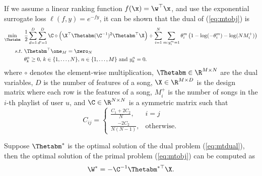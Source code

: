 If we assume a linear ranking function $f(\x) = \w^\top \x$, 
and use the exponential surrogate loss $\ell(f, y) = e^{-fy}$,
it can be shown that the dual of (\ref{eq:mtobj}) is
\begin{equation}
\label{eq:mtdual}
\begin{aligned}
\min_{\Thetabm} \ \ & \frac{1}{2} \sum_{d=1}^{D} \sum_{d'=1}^{D} \C \circ \left( \X^\top \Thetabm (\C^{-1})^2 \Thetabm^\top \X \right) 
    + \sum_{i = 1}^{N} \sum_{m: y_i^m = 1} \theta_i^m \left( 1 - \log(-\theta_i^m) - \log(N M_i^+) \right) \\
s.t. \ & \Thetabm^\top \one_M = \zero_{N} \\
       & \theta_k^n \ge 0, \, k \in \{1,\dots,N\}, \, n \in \{1,\dots,M\} \ \mathrm{and} \ y_k^n = 0.
\end{aligned}
\end{equation}
where $\circ$ denotes the element-wise multiplication,
$\Thetabm \in \R^{M \times N}$ are the dual variables, $D$ is the number of features of a song, 
$\X \in \R^{M \times D}$ is the design matrix where each row is the features of a song,
$M_i^+$ is the number of songs in the $i$-th playlist of user $u$,
and $\C \in \R^{N \times N}$ is a symmetric matrix such that
\begin{equation*}
C_{ij} = \begin{cases}
\frac{C_1 + 2C_2}{N}, & i = j \\
\frac{-2C_2}{N (N - 1)},  & \mathrm{otherwise}.
\end{cases}
\end{equation*}

Suppose $\Thetabm^*$ is the optimal solution of the dual problem (\ref{eq:mtdual}), 
then the optimal solution of the primal problem (\ref{eq:mtobj}) can be computed as
\begin{equation*}
\W^* = -\C^{-1} \Thetabm^{*\top} \X.
\end{equation*}



